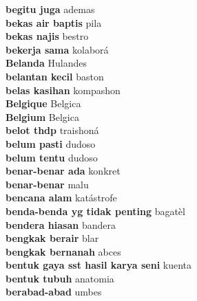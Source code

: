 \textbf{ begitu juga  } ademas \\
\textbf{ bekas air baptis  } pila \\
\textbf{ bekas najis  } bestro \\
\textbf{ bekerja sama  } kolaborá \\
\textbf{ Belanda  } Hulandes \\
\textbf{ belantan kecil  } baston \\
\textbf{ belas kasihan  } kompashon \\
\textbf{ Belgique  } Belgica \\
\textbf{ Belgium  } Belgica \\
\textbf{ belot thdp  } traishoná \\
\textbf{ belum pasti  } dudoso \\
\textbf{ belum tentu  } dudoso \\
\textbf{ benar-benar ada  } konkret \\
\textbf{ benar-benar  } malu \\
\textbf{ bencana alam  } katástrofe \\
\textbf{ benda-benda yg tidak penting  } bagatèl \\
\textbf{ bendera hiasan  } bandera \\
\textbf{ bengkak berair  } blar \\
\textbf{ bengkak bernanah  } abces \\
\textbf{ bentuk gaya sst hasil karya seni  } kuenta \\
\textbf{ bentuk tubuh  } anatomia \\
\textbf{ berabad-abad  } umbes \\
